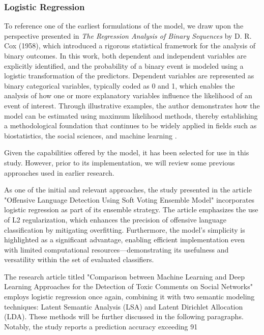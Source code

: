 \subsubsection{Logistic Regression}
To reference one of the earliest formulations of the model, we draw upon the perspective presented in \textit{The Regression Analysis of Binary Sequences} by D. R. Cox (1958), which introduced a rigorous statistical framework for the analysis of binary outcomes. In this work, both dependent and independent variables are explicitly identified, and the probability of a binary event is modeled using a logistic transformation of the predictors. Dependent variables are represented as binary categorical variables, typically coded as 0 and 1, which enables the analysis of how one or more explanatory variables influence the likelihood of an event of interest. Through illustrative examples, the author demonstrates how the model can be estimated using maximum likelihood methods, thereby establishing a methodological foundation that continues to be widely applied in fields such as biostatistics, the social sciences, and machine learning \citep{cox1958logistic}.

Given the capabilities offered by the model, it has been selected for use in this study. However, prior to its implementation, we will review some previous approaches used in earlier research.

As one of the initial and relevant approaches, the study presented in the article "Offensive Language Detection Using Soft Voting Ensemble Model" \citep{supert2023offensive} incorporates logistic regression as part of its ensemble strategy. The article emphasizes the use of L2 regularization, which enhances the precision of offensive language classification by mitigating overfitting. Furthermore, the model's simplicity is highlighted as a significant advantage, enabling efficient implementation even with limited computational resources—demonstrating its usefulness and versatility within the set of evaluated classifiers.

The research article titled "Comparison between Machine Learning and Deep Learning Approaches for the Detection of Toxic Comments on Social Networks" \citep{bonetti2023comparison} employs logistic regression once again, combining it with two semantic modeling techniques: Latent Semantic Analysis (LSA) and Latent Dirichlet Allocation (LDA). These methods will be further discussed in the following paragraphs. Notably, the study reports a prediction accuracy exceeding 91%
